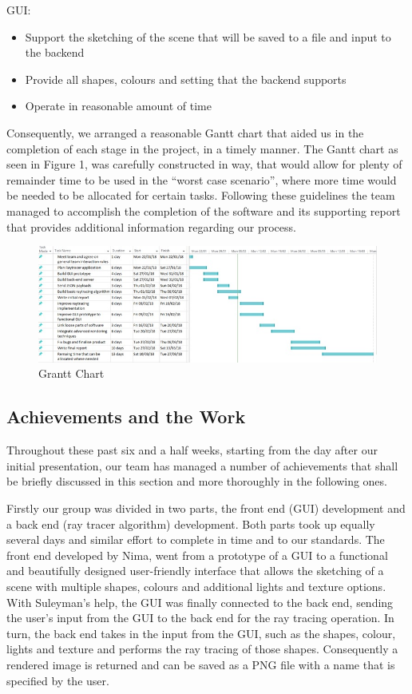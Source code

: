 \documentclass[11pt,a4paper]{article}
\begin{document}
GUI:
\begin{itemize}[nosep, wide=20pt, leftmargin=*, after=\strut]
    \item Support the sketching of the scene that will be saved to a file and input to the backend
    \item Provide all shapes, colours and setting that the backend supports
    \item Operate in reasonable amount of time 
\end{itemize}

Consequently, we arranged a reasonable Gantt chart that aided us in the completion of each stage in the project, in a timely manner. The Gantt chart as seen in Figure 1, was carefully constructed in way, that would allow for plenty of remainder time to be used in the “worst case scenario”, where more time would be needed to be allocated for certain tasks. Following these guidelines the team managed to accomplish the completion of the software and its supporting report that provides additional information regarding our process. 

\begin{figure}[h]
\centering
\includegraphics[scale = 0.4]{ganttchart.jpeg}
\caption{Grantt Chart}
\end{figure}

\subsection{Achievements and the Work}

Throughout these past six and a half weeks, starting from the day after our initial presentation, our team has managed a number of achievements that shall be briefly discussed in this section and more thoroughly in the following ones.

Firstly our group was divided in two parts, the front end (GUI) development and a back end (ray tracer algorithm) development. Both parts took up equally several days and similar effort to complete in time and to our standards. The front end developed by Nima, went from a prototype of a GUI to a functional and beautifully designed user-friendly interface that allows the sketching of a scene with multiple shapes, colours and additional lights and texture options. With Suleyman’s help, the GUI was finally connected to the back end, sending the user’s input from the GUI to the back end for the ray tracing operation. In turn, the back end takes in the input from the GUI, such as the shapes, colour, lights and texture and performs the ray tracing of those shapes. Consequently a rendered image is returned and can be saved as a PNG file with a name that is specified by the user. 
\end{document}
